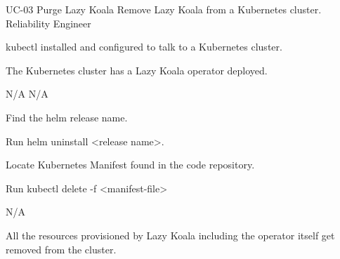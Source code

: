 \vspace{-2em}
\UseCaseDescription
{UC-03}
{Purge Lazy Koala}
{Remove Lazy Koala from a Kubernetes cluster.}
{Reliability Engineer}
{\begin{CompactItemizes}
    \item kubectl installed and configured to talk to a Kubernetes cluster.
    \item The Kubernetes cluster has a Lazy Koala operator deployed.
\end{CompactItemizes}}
{N/A}
{N/A}
{\begin{CompactEnumerate}
    \item Find the helm release name.
    \item Run helm uninstall <release name>.
\end{CompactEnumerate}}
{{\begin{CompactEnumerate}
    \item Locate Kubernetes Manifest found in the code repository.
    \item Run kubectl delete -f <manifest-file>
\end{CompactEnumerate}}
{N/A}
{\begin{CompactItemizes}
    \item All the resources provisioned by Lazy Koala including the operator itself get removed from the cluster.
\end{CompactItemizes}}}

